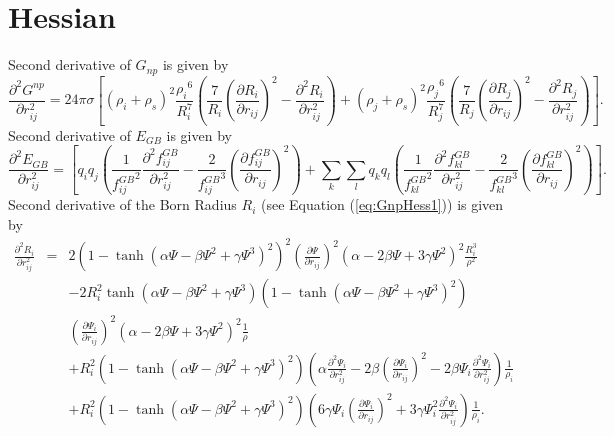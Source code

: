 \documentclass[12pt]{article}
\begin{document}
\section{Hessian}
Second derivative of $G_{np}$ is given by
\begin{equation}
\label{eq:GnpHess1}
\frac{\partial^{2} G^{np}}{\partial r_{ij}^{2}} = 24{\pi}{\sigma}\left[ ({\rho}_{i} + {\rho}_{s})^{2}\frac{{\rho_{i}}^{6}}{R_{i}^{7}}
\left(\frac{7}{R_{i}}\left(\frac{\partial R_{i}}{\partial r_{ij}}\right)^{2} - \frac{\partial^{2}R_{i}}{\partial r_{ij}^{2}}\right)+ ({\rho}_{j} + {\rho}_{s})^{2}
\frac{{\rho_{j}}^{6}}{R_{j}^{7}} \left(\frac{7}{R_{j}}\left(\frac{\partial R_{j}}{\partial r_{ij}}\right)^{2} -  \frac{\partial^{2}R_{j}}{\partial r_{ij}^{2}}\right) \right]. 
\end{equation}
Second derivative of $E_{GB}$ is given by
\begin{equation}
\frac{\partial^{2} E_{GB}}{\partial r_{ij}^{2}} = \left[ q_{i}q_{j}\left(\frac{1}{{f_{ij}^{GB}}^{2}}\frac{\partial^{2}f_{ij}^{GB}}{\partial r_{ij}^{2}} - \frac{2}{{f_{ij}^{GB}}^{3}}\left(\frac{\partial f_{ij}^{GB}}{\partial r_{ij}}\right)^{2} \right) + \displaystyle\sum_{k}\displaystyle\sum_{l}q_{k}q_{l} \left( \frac{1}{{f_{kl}^{GB}}^{2}}\frac{\partial^{2}f_{kl}^{GB}}{\partial r_{ij}^{2}} - \frac{2}{{f_{kl}^{GB}}^{3}}\left(\frac{\partial f_{kl}^{GB}}{\partial r_{ij}}\right)^{2}\right) \right].
\end{equation}
Second derivative of the Born Radius $R_{i}$ (see Equation (\ref{eq:GnpHess1})) is given by
\begin{eqnarray}
\frac{\partial^{2}R_{i}}{\partial r_{ij}^{2}} & = & 2(1 - \tanh({\alpha}{\Psi} - {\beta}{\Psi}^{2} + {\gamma}{\Psi}^{3})^{2})^{2}(\frac{\partial {\Psi}}{\partial r_{ij}})^{2}({\alpha} - 2{\beta}{\Psi} + 3{\gamma}{\Psi}^{2})^{2}\frac{R_{i}^{3}}{\rho^{2}} \\ \nonumber
& & - 2R_{i}^{2} \tanh({\alpha}{\Psi} - {\beta}{\Psi}^{2} + {\gamma}{\Psi}^{3})(1 -{\tanh({\alpha}{\Psi} - {\beta}{\Psi}^{2} + {\gamma}{\Psi}^{3})}^{2})\\ \nonumber 
& &\left(\frac{\partial {\Psi}_{i}}{\partial r_{ij}}\right)^{2}({\alpha} - 2{\beta}{\Psi} + 3{\gamma}{\Psi}^{2})^{2}\frac{1}{\rho} \\ \nonumber
& & + R_{i}^{2}(1 - \tanh({\alpha}{\Psi} - {\beta}{\Psi}^{2} + {\gamma}{\Psi}^{3})^{2})({\alpha}\frac{\partial^{2}{\Psi}_{i}}{\partial r_{ij}^{2}} - 2{\beta}(\frac{\partial {\Psi}_{i}}{\partial r_{ij}})^{2} - 2{\beta}{\Psi}_{i}\frac{\partial^{2}{\Psi}_{i}}{\partial r_{ij}^{2}})\frac{1}{{\rho}_{i}} \\ \nonumber
& & +R_{i}^{2}(1 - \tanh({\alpha}{\Psi} - {\beta}{\Psi}^{2} + {\gamma}{\Psi}^{3})^{2})( 6{\gamma}{\Psi}_{i}(\frac{\partial {\Psi}_{i}}{\partial r_{ij}})^{2} + 3{\gamma}{\Psi}_{i}^{2}\frac{\partial^{2}{\Psi}_{i}}{\partial r_{ij}^{2}})\frac{1}{{\rho}_{i}}.
\end{eqnarray}
\end{document}
